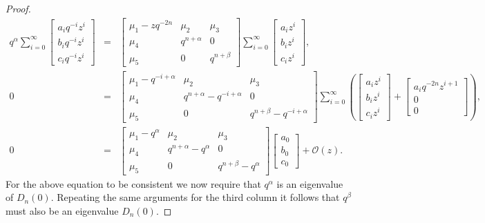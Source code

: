\documentclass[10pt,a4paper]{amsart}
\begin{document}
\begin{proof}
\begin{eqnarray}
   q^{\alpha}\sum_{i=0}^\infty\begin{bmatrix}
   a_i q^{-i}z^i\\
   b_i q^{-i}z^i\\
    c_i q^{-i}z^i
 \end{bmatrix}&=& \begin{bmatrix}
    \mu_{1}-zq^{-2n} & \mu_{2} &\mu_{3}\\
   \mu_{4}&q^{n+\alpha}&0 \\
   \mu_{5}&0&q^{n+\beta}
   \end{bmatrix}\sum_{i=0}^\infty\begin{bmatrix}
   a_i z^i\\
   b_i z^i\\
    c_i z^i
 \end{bmatrix},\nonumber\\
 0
 &=& \begin{bmatrix}
    \mu_{1}-q^{-i+\alpha} & \mu_{2} &\mu_{3}\\
   \mu_{4}&q^{n+\alpha}-q^{-i+\alpha}&0 \\
   \mu_{5}&0&q^{n+\beta}-q^{-i+\alpha}
   \end{bmatrix}\sum_{i=0}^\infty\left(\begin{bmatrix}
   a_i z^i\\
   b_i z^i\\
    c_i z^i
 \end{bmatrix}+ \begin{bmatrix}
   a_i q^{-2n}z^{i+1}\\
   0\\
    0
 \end{bmatrix}\right),\nonumber\\
  0
 &=& \begin{bmatrix}
    \mu_{1}-q^{\alpha} & \mu_{2} &\mu_{3}\\
   \mu_{4}&q^{n+\alpha}-q^{\alpha}&0 \\
   \mu_{5}&0&q^{n+\beta}-q^{\alpha}
   \end{bmatrix} \begin{bmatrix}
   a_0 \\
   b_0 \\
    c_0 
 \end{bmatrix}+ \mathcal{O}(z).\label{Equation X}
\end{eqnarray}
For the above equation to be consistent we now require that $q^\alpha$ is an eigenvalue of $D_n(0)$. Repeating the same arguments for the third column it follows that $q^{\beta}$ must also be an eigenvalue $D_n(0)$.
\end{proof}
\end{document}
